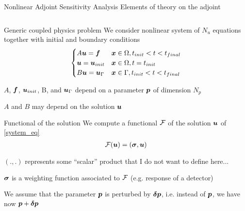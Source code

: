 

\begin{frame}{Nonlinear Adjoint Sensitivity Analysis}
  {Elements of theory on the adjoint}
  \tiny

  \begin{columns}[T]
  \begin{column}{5.5cm}

  \begin{block}{Generic coupled physics problem}
    We consider nonlinear system of $ N_{u} $ equations together with initial and boundary conditions
    \begin{align}
      \begin{cases}
      A \boldsymbol{u} = \boldsymbol{f} & \boldsymbol{x} \in \Omega , t_{init} < t < t_{final} \\
      \boldsymbol{u} = \boldsymbol{u}_{init} & \boldsymbol{x} \in \Omega , t = t_{init} \\
      B \boldsymbol{u} = \boldsymbol{u}_{\Gamma} & \boldsymbol{x} \in \Gamma , t_{init} < t < t_{final}
      \end{cases} \label{system_eq}
    \end{align}
  \end{block}

    $ A $, $ \boldsymbol{f} $, $ \boldsymbol{u}_{init} $, B, and $ \boldsymbol{u}_{\Gamma} $ depend on a parameter $ \boldsymbol{p} $ of dimension $ N_{p} $
    
    $ A $ and $ B $ may depend on the solution $ \boldsymbol{u} $

  \begin{block}{Functional of the solution}
    We compute a functional $ \mathcal{F} $ of the solution $ \boldsymbol{u} $ of \eqref{system_eq}
    \begin{align}
      \mathcal{F} (\boldsymbol{u})
      = ( \boldsymbol{\sigma}, \boldsymbol{u} ) \nonumber
    \end{align}
  \end{block}

    $ (., .) $ represents some ``scalar'' product that I do not want to define here...

    $ \boldsymbol{\sigma} $ is a weighting function associated to $ \mathcal{F} $ (e.g. response of a detector)
    
    \vspace{.3cm}
     
    We assume that the parameter $ \boldsymbol{p} $ is perturbed by $ \boldsymbol{\delta p} $, i.e. instead of $ \boldsymbol{p} $, we have now 
    $ \boldsymbol{p} + \boldsymbol{\delta p} $
    

\end{column}
\end{columns}
\end{frame}
